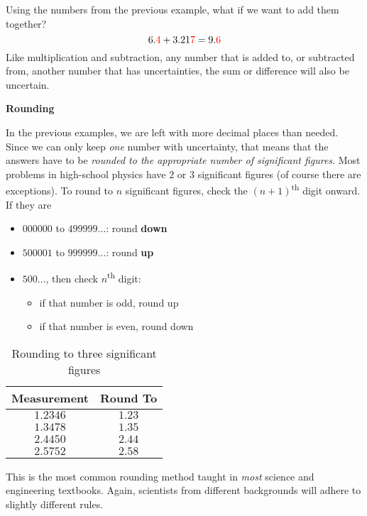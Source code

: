 \documentclass{../../oss-handout}
\begin{document}
Using the numbers from the previous example, what if we want to add them
together?
\begin{equation*}
  6.\textcolor{red}{4} + 3.21\textcolor{red}{7} = 9.\textcolor{red}{6}
\end{equation*}
Like multiplication and subtraction, any number that is added to, or
subtracted from, another number that has uncertainties, the sum or difference
will also be uncertain.

\begin{center}
  \textbf{Rounding}
\end{center}
In the previous examples, we are left with more decimal places than needed.
Since we can only keep \emph{one} number with uncertainty, that means that the
answers have to be \emph{rounded to the appropriate number of significant
  figures}. Most problems in high-school physics have $2$ or $3$ significant
figures (of course there are exceptions). To round to $n$ significant figures,
check the $(n+1)$\textsuperscript{th} digit onward. If they are
\begin{itemize}[noitemsep,topsep=0pt,leftmargin=12pt]
\item $000000$ to $499999\ldots$: round \textbf{down}
\item $500001$ to $999999\ldots$: round \textbf{up}
\item $500\ldots$, then check $n$\textsuperscript{th} digit:
  \begin{itemize}[noitemsep,topsep=0pt]
  \item if that number is odd, round up
  \item if that number is even, round down
  \end{itemize}
\end{itemize}

\begin{table}[ht]
  \centering
  \begin{tabular}{c|c}
    \rowcolor{pink}
    \textbf{Measurement} & \textbf{Round To} \\\hline
    $1.2346$ & $1.23$ \\
    $1.3478$ & $1.35$ \\
    $2.4450$ & $2.44$ \\
    $2.5752$ & $2.58$
  \end{tabular}
  \caption{Rounding to three significant figures}
  \label{tabl:rounding}
\end{table}
This is the most common rounding method taught in \emph{most} science and
engineering textbooks. Again, scientists from different backgrounds will adhere
to slightly different rules.
\end{document}
